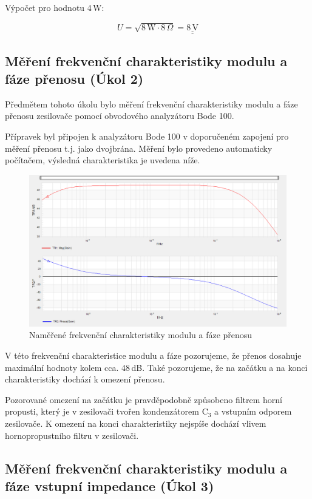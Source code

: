 \documentclass[a4paper, czech]{article}
\begin{document}
Výpočet pro hodnotu 4\,W:

\begin{equation*}
    U = \sqrt{8\,\text{W} \cdot 8\,\Omega} = \underline{\underline{8\,\text{V}}}
\end{equation*}

\subsection{Měření frekvenční charakteristiky modulu a fáze přenosu (Úkol 2)}

Předmětem tohoto úkolu bylo měření frekvenční charakteristiky modulu a fáze přenosu zesilovače
pomocí obvodového analyzátoru Bode 100.

Přípravek byl připojen k analyzátoru Bode 100 v doporučeném zapojení pro měření přenosu
t.j. jako dvojbrána.
Měření bylo provedeno automaticky počítačem, výsledná charakteristika je uvedena níže.

\begin{figure}[H]
    \centering
    \includegraphics[width=\textwidth]{nkzt10_120324/nkzt10_2.png}
    \caption{Naměřené frekvenční charakteristiky modulu a fáze přenosu}
\end{figure}

V této frekvenční charakteristice modulu a fáze pozorujeme, že přenos dosahuje maximální hodnoty
kolem cca. 48\,dB.
Také pozorujeme, že na začátku a na konci charakteristiky dochází k omezení přenosu.

Pozorované omezení na začátku je pravděpodobně způsobeno filtrem horní propusti,
který je v zesilovači tvořen kondenzátorem C$_3$ a vstupním odporem zesilovače.
K omezení na konci charakteristiky nejspíše dochází vlivem hornopropustního filtru v zesilovači.

\subsection{Měření frekvenční charakteristiky modulu a fáze vstupní impedance (Úkol 3)}
\end{document}
